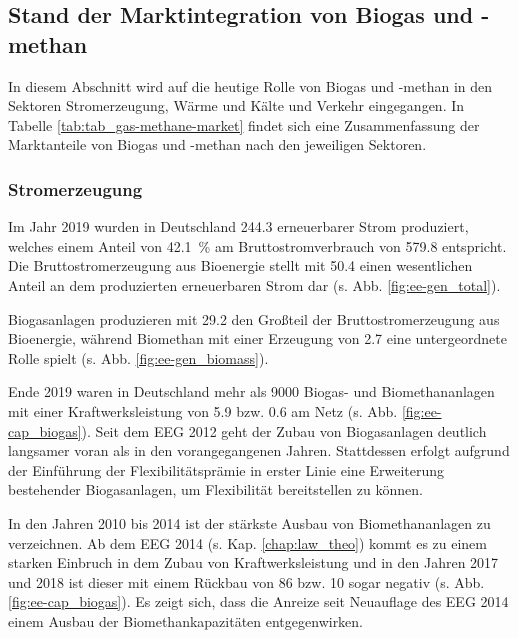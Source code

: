 \subsection{Stand der Marktintegration von Biogas und -methan}

In diesem Abschnitt wird auf die heutige Rolle von Biogas und -methan in den Sektoren Stromerzeugung, Wärme und Kälte und Verkehr eingegangen. In Tabelle \ref{tab:tab_gas-methane-market} findet sich eine Zusammenfassung der Marktanteile von Biogas und -methan nach den jeweiligen Sektoren.




\subsubsection{Stromerzeugung}

Im Jahr 2019 wurden in Deutschland \SI{244.3}{\twh} erneuerbarer Strom produziert, welches einem Anteil von \SI{42.1}{\percent} am Bruttostromverbrauch von \SI{579.8}{\twh} entspricht. Die Bruttostromerzeugung aus Bioenergie stellt mit \SI{50.4}{\twh} einen wesentlichen Anteil an dem produzierten erneuerbaren Strom dar (s. Abb. \ref{fig:ee-gen_total}). \parencite{BWE2020} 



Biogasanlagen produzieren mit \SI{29.2}{\twh} den Großteil der Bruttostromerzeugung aus Bioenergie, während Biomethan mit einer Erzeugung von \SI{2.7}{\twh} eine untergeordnete Rolle spielt (s. Abb. \ref{fig:ee-gen_biomass}). \parencite{BWE2020} 



Ende 2019 waren in Deutschland mehr als \SI{9000}{\relax} Biogas- und Biomethananlagen mit einer Kraftwerksleistung von \SI{5.9}{\gw} bzw. \SI{0.6}{\gw} am Netz (s. Abb. \ref{fig:ee-cap_biogas}). Seit dem \gls{EEG} \SI{2012}{\relax} geht der Zubau von Biogasanlagen deutlich langsamer voran als in den vorangegangenen Jahren. Stattdessen erfolgt aufgrund der Einführung der Flexibilitätsprämie in erster Linie eine Erweiterung bestehender Biogasanlagen, um Flexibilität bereitstellen zu können. \parencite{BWE2020} \parencite{DanielGromke2019}



In den Jahren \SI{2010}{\relax} bis \SI{2014}{\relax} ist der stärkste Ausbau von Biomethananlagen zu verzeichnen. Ab dem \gls{EEG} \SI{2014}{\relax} (s. Kap. \ref{chap:law_theo}) kommt es zu einem starken Einbruch in dem Zubau von Kraftwerksleistung und in den Jahren \SI{2017}{\relax} und \SI{2018}{\relax} ist dieser mit einem Rückbau von \SI{86}{\mw} bzw. \SI{10}{\mw} sogar negativ (s. Abb. \ref{fig:ee-cap_biogas}). Es zeigt sich, dass die Anreize seit Neuauflage des \gls{EEG} \SI{2014}{\relax} einem Ausbau der Biomethankapazitäten entgegenwirken. \parencite{BWE2020} \smallskip

